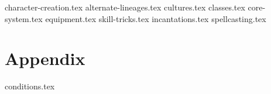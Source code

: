 \documentclass[10pt,twoside,openany]{dndbook}
\begin{document}
{character-creation.tex}
{alternate-lineages.tex}
{cultures.tex}
{classes.tex}
{core-system.tex}
{equipment.tex}
{skill-tricks.tex}
{incantations.tex}
{spellcasting.tex}
\chapter{Appendix}\label{ch:appendix}
{conditions.tex}
\end{document}
